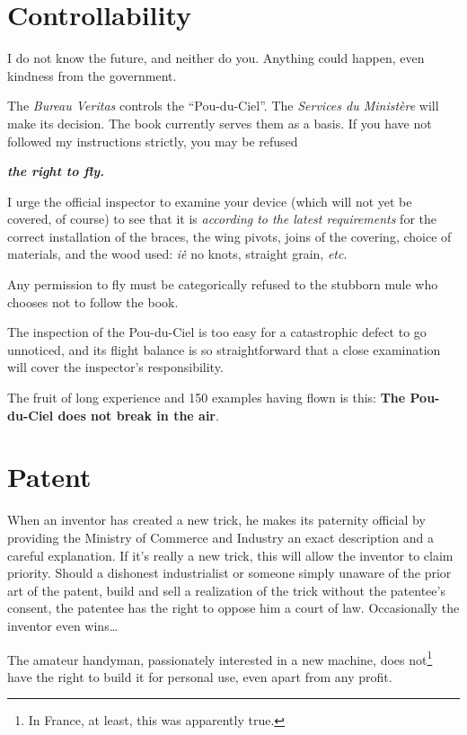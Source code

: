\documentclass{book}
\begin{document}
\section{Controllability}

I do not know the future, and neither do you. Anything could happen,
even kindness from the government.

The \textit{Bureau Veritas} controls the ``Pou-du-Ciel''. The
\textit{Services du Ministère} will make its decision. The book
currently serves them as a basis. If you have not followed my
instructions strictly, you may be refused

\begin{center}
  \textbf{ \large \emph{the right to fly.}}
\end{center}

I urge the official inspector to examine your device (which will not
yet be covered, of course) to see that it is \emph{according to the
  latest requirements} for the correct installation of the braces, the
wing pivots, joins of the covering, choice of materials, and the wood
used: \textit{i\.e\.} no knots, straight grain, \textit{etc}.

Any permission to fly must be categorically refused to the stubborn
mule who chooses not to follow the book.

The inspection of the Pou-du-Ciel is too easy for a catastrophic
defect to go unnoticed, and its flight balance is so straightforward
that a close examination will cover the inspector's responsibility.

The fruit of long experience and 150 examples having flown is this:
\textbf{The Pou-du-Ciel does not break in the air}.

\section{Patent}

When an inventor has created a new trick, he makes its paternity
official by providing the Ministry of Commerce and Industry an exact
description and a careful explanation. If it's really a new trick,
this will allow the inventor to claim priority. Should a dishonest
industrialist or someone simply unaware of the prior art of the
patent, build and sell a realization of the trick without the
patentee's consent, the patentee has the right to oppose him a court
of law. Occasionally the inventor even wins\ldots

The amateur handyman, passionately interested in a new machine, does
not\footnote{In France, at least, this was apparently true.} have the
right to build it for personal use, even apart from any profit.
\end{document}
